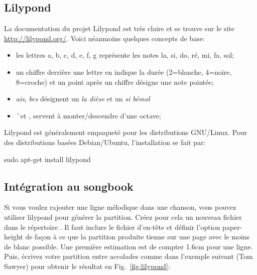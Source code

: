 \documentclass[versionenligne]{patacrep}
\begin{document}
\subsection{Lilypond}

La documentation du projet Lilypond est très
claire et se trouve sur le site \url{http://lilypond.org/}.
Voici néanmoins quelques concepts de base:

\begin{itemize}
\item les lettres a, b, c, d, e, f, g représente les notes la, si, do,
  ré, mi, fa, sol;
\item un chiffre derrière une lettre en indique la durée (2=blanche, 4=noire,
  8=croche) et un point après un chiffre désigne une note pointée;
\item \emph{ais}, \emph{bes} désignent un \emph{la dièse} et un \emph{si bémol}
\item \emph{'} et \emph{,} servent à monter/descendre d'une octave;
\end{itemize}

Lilypond est généralement empaqueté pour les distributions
GNU/Linux. Pour des distributions basées Debian/Ubuntu, l'installation
se fait par:

\begin{unixcom}
  sudo apt-get install lilypond
\end{unixcom}


\subsection{Intégration au songbook}

Si vous voulez rajouter une ligne mélodique dans une chanson, vous
pouvez utiliser lilypond pour générer la partition. Créez pour cela un
nouveau fichier  dans le répertoire .
Il faut inclure le fichier d'en-tête  et définir l'option
paper-height de façon à ce que la partition produite tienne sur une
page avec le moins de blanc possible. Une première estimation est de
compter 1.6cm pour une ligne. Puis, écrivez votre partition entre
accolades comme dans l'exemple suivant (Tom Sawyer) pour obtenir le
résultat en Fig.~\ref{fig:lilypond}:
\end{document}
